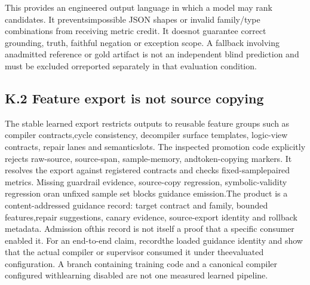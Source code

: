 \noindent
This provides an engineered output language in which a model may rank candidates. It prevents\linebreak[4]
impossible JSON shapes or invalid family/type combinations from receiving metric credit. It does\linebreak[4]
not guarantee correct grounding, truth, faithful negation or exception scope. A fallback involving an\linebreak[4]
admitted reference or gold artifact is not an independent blind prediction and must be excluded or\linebreak[4]
reported separately in that evaluation condition.\par

\subsection*{K.2  Feature export is not source copying}
\noindent
The stable learned export restricts outputs to reusable feature groups such as compiler contracts,\linebreak[4]
cycle consistency, decompiler surface templates, logic-view contracts, repair lanes and semantic\linebreak[4]
slots. The inspected promotion code explicitly rejects raw-source, source-span, sample-memory, and\linebreak[4]
token-copying markers. It resolves the export against registered contracts and checks fixed-sample\linebreak[4]
paired metrics. Missing guardrail evidence, source-copy regression, symbolic-validity regression or\linebreak[4]
an unfixed sample set blocks guidance emission.\linebreak[4]
The product is a content-addressed guidance record: target contract and family, bounded features,\linebreak[4]
repair suggestions, canary evidence, source-export identity and rollback metadata. Admission of\linebreak[4]
this record is not itself a proof that a specific consumer enabled it. For an end-to-end claim, record\linebreak[4]
the loaded guidance identity and show that the actual compiler or supervisor consumed it under the\linebreak[4]
evaluated configuration. A branch containing training code and a canonical compiler configured with\linebreak[4]
learning disabled are not one measured learned pipeline.\par

